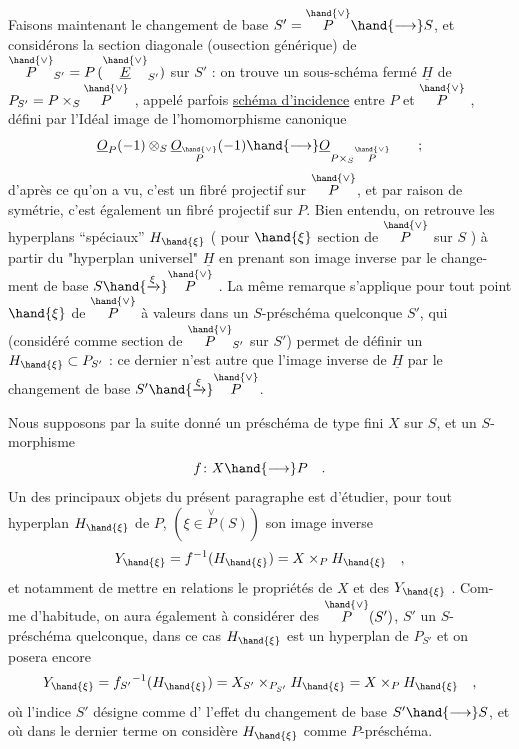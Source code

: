 
Faisons maintenant le changement de base $S'=\overset{\hand{\vee}}{P}\hand{\longrightarrow} S$, et considérons
la section diagonale (ousection générique) de $\overset{\hand{\vee}}{P}_{S'} = P\,(\overset{\hand{\vee}}{\underline{E}}_{S'})$ sur $S'$ :
on trouve un sous-schéma fermé $\underline{H}$ de $P_{S'} = P\times_S\overset{\hand{\vee}}{P}$ , appelé parfois
\uline{schéma d'incidence} entre $P$ et $\overset{\hand{\vee}}{P}$ , défini par l'Idéal image de
l'homomorphisme canonique
\[ \underline{O}_P(-1)\otimes_S\underline{O}_{\overset{\hand{\vee}}{P}}(-1)\hand{\longrightarrow} \underline{O}_{P\times_S\overset{\hand{\vee}}{P}} \qquad ; \]
d'après ce qu'on a vu, c'est un fibré projectif sur $\overset{\hand{\vee}}{P}$, et par raison de
symétrie, c'est également un fibré projectif sur $P$. Bien entendu, on
retrouve les hyperplans ``spéciaux'' $H_{\hand{\xi}}$ ( pour $\hand{\xi}$ section de $\overset{\hand{\vee}}{P}$ sur $S$ )\hand{,} à partir
du "hyperplan universel" $\underline{H}$\hand{,} en prenant son image inverse par le change-%
ment de base $S\hand{\xrightarrow{\xi}}\overset{\hand{\vee}}{P}$ . La même remarque s'applique pour tout point
$\hand{\xi}$ de $\overset{\hand{\vee}}{P}$ à valeurs dans un $S$-préschéma quelconque $S'$, qui (considéré comme
section de $\overset{\hand{\vee}}{P}_{S'}$ sur $S'$) permet de définir un $H_{\hand{\xi}}\subset P_{S'}$ : ce dernier n'est
autre que l'image inverse de $\underline{H}$ par le changement de base $S'\hand{\xrightarrow{\xi}}\overset{\hand{\vee}}{P}$.

Nous supposons par la suite donné un préschéma de type fini $X$ sur $S$,
et un $S$-morphisme
\[ f\colon X\hand{\longrightarrow} P \quad . \]
\placedmargin{$|$}Un des principaux objets du présent paragraphe est d'étudier, pour tout
\placedmargin{$|$}hyperplan $H_{\hand{\xi}}$ de $P$, $(\xi\in\overset{\vee}{P}(S))$ son image inverse
\[ Y_{\hand{\xi}} = f^{-1}(H_{\hand{\xi}}) = X\times_P H_{\hand{\xi}} \quad , \]
et notamment de mettre en relations le propriétés de $X$ et des $Y_{\hand{\xi}}$ . Com-%
me d'habitude, on aura également à considérer des $\overset{\hand{\vee}}{P}(S')$, $S'$ 
un $S$-préschéma quelconque, dans ce cas $H_{\hand{\xi}}$ est un hyperplan de $P_{S'}$ \hand{,}
et on posera encore
\[ Y_{\hand{\xi}} = f_{S'}{}^{-1}(H_{\hand{\xi}}) = X_{S'}\times_{P_{S'}}H_{\hand{\xi}} = X\times_P H_{\hand{\xi}} \quad , \]
où l'indice $S'$ désigne comme d'  l'effet du changement de base
$S'\hand{\longrightarrow} S$, et où dans le dernier terme on considère $H_{\hand{\xi}}$ comme $P$-préschéma.

